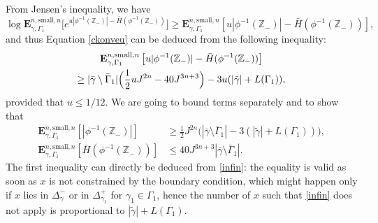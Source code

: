 \documentclass[JEP,XML,SOM,Unicode, NoFloatCountersInSection]{cedram}
\numberwithin{equation}{section}
\theoremstyle{plain}
\theoremstyle{definition}
\newcommand{\sm}{\mathrm{small}}
\newcommand{\bE}{{\ensuremath{\mathbf E}} }
\newcommand{\bbZ}{{\ensuremath{\mathbb Z}} }
\newcommand{\gG}{\Gamma}
\begin{document}
From Jensen's inequality, we have
\begin{equation*}
\log \bE^{n,\sm,n}_{\gamma,\gG_1}\bigl[e^{u|\phi^{-1}(\bbZ_-)|-\bar H(\phi^{-1}(\bbZ_-))}\bigr]
\ge \bE^{n,\sm,n}_{\gamma,\gG_1}\left[u|\phi^{-1}(\bbZ_-)|-\bar H(\phi^{-1}(\bbZ_-))\right],
\end{equation*}
and thus Equation \eqref{ckonveu}
can be deduced from the following inequality:
\begin{multline*}
\bE^{n,\sm,n}_{\gamma,\gG_1}\left[u|\phi^{-1}(\bbZ_-)|-\bar H(\phi^{-1}(\bbZ_-))\right]\\
\ge
|\bar \gamma \setminus \bar \gG_1|\Bigl(\frac{1}{2}u J^{2n}-40J^{3n+3}\Bigr)-3u(|\tilde \gamma|+L(\gG_1)),
\end{multline*}
provided that $u\le 1/12$.
We are going to bound terms separately and to show that%
\begin{equation}\label{lixiout}\begin{split}
\bE^{n,\sm,n}_{\gamma,\gG_1}\left[|\phi^{-1}(\bbZ_-)| \right]&\ge
\frac{1}{2}J^{2n}\bigl(|\bar \gamma\setminus\bar \gG_1|-3(|\tilde \gamma|+L(\gG_1))\bigr),\\
\bE^{n,\sm,n}_{\gamma,\gG_1}\left[\bar H(\phi^{-1}(\bbZ_-)) \right]&\le 40 J^{3n+3}|\bar \gamma\setminus\bar \gG_1|.
\end{split}\end{equation}
The first inequality can directly be deduced from \eqref{infin}: the equality is valid as soon as $x$ is not constrained by the boundary condition,
which might happen only if $x$ lies in $\Delta^-_{\gamma}$ or in $\Delta^+_{\gamma_1}$ for $\gamma_1\in \gG_1$,
hence the number of $x$ such that \eqref{infin} does not apply is proportional to $|\tilde \gamma|+L(\gG_1)$.
\end{document}
